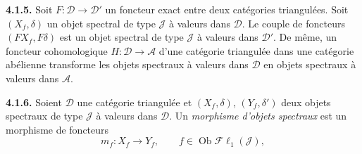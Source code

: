 \medskip\noindent\textbf{4.1.5.}\quad
Soit $F\colon\mathcal D\to\mathcal D'$ un foncteur exact entre deux
catégories triangulées. Soit $(X_f,\delta)$ un objet spectral de type
$\mathcal J$ à valeurs dans $\mathcal D$. Le couple de foncteurs
$(FX_f,F\delta)$ est un objet spectral de type $\mathcal J$ à valeurs dans
$\mathcal D'$. De même, un foncteur cohomologique
$H\colon\mathcal D\to\mathcal A$ d'une catégorie triangulée dans une
catégorie abélienne transforme les objets spectraux à valeurs dans
$\mathcal D$ en objets spectraux à valeurs dans $\mathcal A$.

\medskip\noindent\textbf{4.1.6.}\quad
Soient $\mathcal D$ une catégorie triangulée et $(X_f,\delta)$,
$(Y_f,\delta')$ deux objets spectraux de type $\mathcal J$ à valeurs dans
$\mathcal D$. Un \emph{morphisme d'objets spectraux} est un morphisme de
foncteurs
\[
m_f\colon X_f\longrightarrow Y_f,\qquad
f\in\operatorname{Ob}\mathcal{F}\ell_1(\mathcal J),
\]
\endgroup
